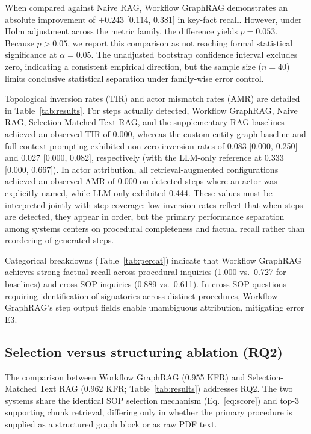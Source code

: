 \documentclass[preprint,10pt]{elsarticle}
\begin{document}
When compared against Naive RAG, Workflow GraphRAG demonstrates an absolute improvement of $+0.243$ [0.114, 0.381] in key-fact recall. However, under Holm adjustment across the metric family, the difference yields $p = 0.053$. Because $p > 0.05$, we report this comparison as not reaching formal statistical significance at $\alpha = 0.05$. The unadjusted bootstrap confidence interval excludes zero, indicating a consistent empirical direction, but the sample size ($n=40$) limits conclusive statistical separation under family-wise error control.

Topological inversion rates (TIR) and actor mismatch rates (AMR) are detailed in Table~\ref{tab:results}. For steps actually detected, Workflow GraphRAG, Naive RAG, Selection-Matched Text RAG, and the supplementary RAG baselines achieved an observed TIR of 0.000, whereas the custom entity-graph baseline and full-context prompting exhibited non-zero inversion rates of 0.083 [0.000, 0.250] and 0.027 [0.000, 0.082], respectively (with the LLM-only reference at 0.333 [0.000, 0.667]). In actor attribution, all retrieval-augmented configurations achieved an observed AMR of 0.000 on detected steps where an actor was explicitly named, while LLM-only exhibited 0.444. These values must be interpreted jointly with step coverage: low inversion rates reflect that when steps are detected, they appear in order, but the primary performance separation among systems centers on procedural completeness and factual recall rather than reordering of generated steps.

Categorical breakdowns (Table~\ref{tab:percat}) indicate that Workflow GraphRAG achieves strong factual recall across procedural inquiries (1.000 vs.\ 0.727 for baselines) and cross-SOP inquiries (0.889 vs.\ 0.611). In cross-SOP questions requiring identification of signatories across distinct procedures, Workflow GraphRAG's step output fields enable unambiguous attribution, mitigating error E3.

\begin{table}[!htbp]
\centering
\caption{Key-fact recall by question category for the primary comparison systems on \nVerified{} verified questions. Procedural category also includes step coverage.}
\label{tab:percat}
\small
\setlength{\tabcolsep}{4pt}
\resizebox{\textwidth}{!}{%
}
\end{table}

\subsection{Selection versus structuring ablation (RQ2)}
\label{sec:ablation-results}
The comparison between Workflow GraphRAG (0.955 KFR) and Selection-Matched Text RAG (0.962 KFR; Table~\ref{tab:results}) addresses RQ2. The two systems share the identical SOP selection mechanism (Eq.~\eqref{eq:score}) and top-3 supporting chunk retrieval, differing only in whether the primary procedure is supplied as a structured graph block or as raw PDF text.
\end{document}
